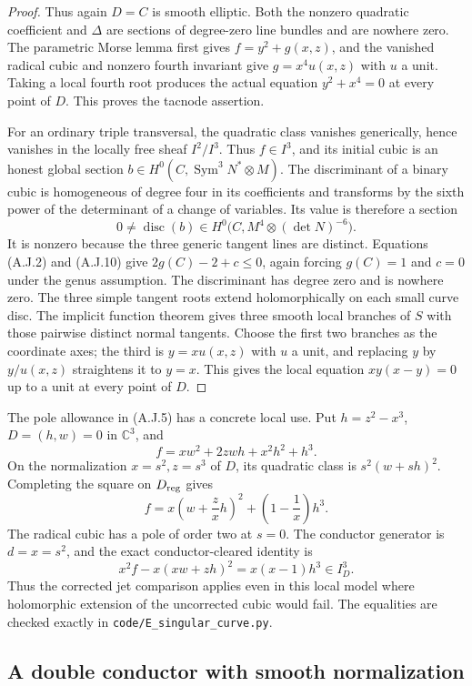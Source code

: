 \begin{proof}
Thus again $D=C$ is smooth elliptic. Both the nonzero
quadratic coefficient and $\Delta$ are sections of
degree-zero line bundles and are nowhere zero. The parametric
Morse lemma first gives $f=y^2+g(x,z)$, and the vanished
radical cubic and nonzero fourth invariant give
$g=x^4u(x,z)$ with $u$ a unit. Taking a local fourth root
produces the actual equation $y^2+x^4=0$ at every point of
$D$. This proves the tacnode assertion.

For an ordinary triple transversal, the quadratic class
vanishes generically, hence vanishes in the locally free
sheaf $I^2/I^3$. Thus $f\in I^3$, and its initial cubic
is an honest global section
$b\in H^0(C,\operatorname{Sym}^3N^*\otimes M)$.
The discriminant of a binary cubic is homogeneous of degree
four in its coefficients and transforms by the sixth power
of the determinant of a change of variables. Its value is
therefore a section
\[
 0\ne\operatorname{disc}(b)\in
 H^0\bigl(C,M^4\otimes(\det N)^{-6}\bigr).
                                                        \tag{A.J.10}
\]
It is nonzero because the three generic tangent lines are
distinct. Equations (A.J.2) and (A.J.10) give
$2g(C)-2+c\leq0$, again forcing $g(C)=1$ and $c=0$
under the genus assumption. The discriminant has degree
zero and is nowhere zero. The three simple tangent roots
extend holomorphically on each small curve disc. The implicit
function theorem gives three smooth local branches of $S$
with those pairwise distinct normal tangents. Choose the
first two branches as the coordinate axes; the third is
$y=xu(x,z)$ with $u$ a unit, and replacing $y$ by $y/u(x,z)$
straightens it to $y=x$. This gives the local equation
$xy(x-y)=0$ up to a unit at every point of $D$.
\end{proof}


The pole allowance in (A.J.5) has a concrete local use. Put
$h=z^2-x^3$, $D=(h,w)=0$ in $\mathbb C^3$, and
\[
 f=xw^2+2zwh+x^2h^2+h^3.
\]
On the normalization $x=s^2,z=s^3$ of $D$, its quadratic
class is $s^2(w+sh)^2$. Completing the square on $D_{\rm reg}$
gives
\[
 f=x\left(w+\frac zx h\right)^2+
                  \left(1-\frac1x\right)h^3.
\]
The radical cubic has a pole of order two at $s=0$.
The conductor generator is $d=x=s^2$, and the exact
conductor-cleared identity is
\[
 x^2f-x(xw+zh)^2=x(x-1)h^3\in I_D^3.
\]
Thus the corrected jet comparison applies even in this local
model where holomorphic extension of the uncorrected cubic
would fail. The equalities are checked exactly in
\texttt{code/E\_singular\_curve.py}.

\subsection{A double conductor with smooth normalization}

